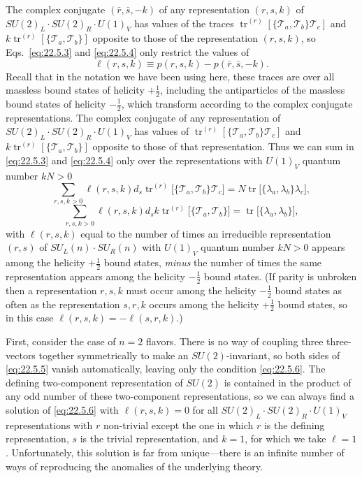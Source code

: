 The complex conjugate $(\bar r,\bar s,-k)$ of any representation $(r,s,k)$
of $SU(2)_L\cdot SU(2)_R\cdot U(1)_V$ has values of the traces
$\operatorname{tr}^{(r)}
[\{\mathcal T_a,\mathcal T_b\}\mathcal T_c]$ and
$k\operatorname{tr}^{(r)}[\{\mathcal T_a,\mathcal T_b\}]$ opposite to
those of the representation $(r,s,k)$, so Eqs.~\eqref{eq:22.5.3} and
\eqref{eq:22.5.4} only restrict the values of
\[
 \ell(r,s,k)\equiv p(r,s,k)-p(\bar r,\bar s,-k).
\]
Recall that in the notation we have been using here, these traces are over
all massless bound states of helicity $+\frac12$, including the
antiparticles of the massless bound states of helicity $-\frac12$, which
transform according to the complex conjugate representations. The complex
conjugate of any representation of
$SU(2)_L\cdot SU(2)_R\cdot U(1)_V$ has values of
$\operatorname{tr}^{(r)}
[\{\mathcal T_a,\mathcal T_b\}\mathcal T_c]$ and
$k\operatorname{tr}^{(r)}[\{\mathcal T_a,\mathcal T_b\}]$ opposite to
those of that representation. Thus we can sum in \eqref{eq:22.5.3} and
\eqref{eq:22.5.4} only over the representations with $U(1)_V$ quantum
number $kN>0$
\begin{equation}
 \sum_{r,s,k>0}\ell(r,s,k)d_s
 \operatorname{tr}^{(r)}
 \bigl[\{\mathcal T_a,\mathcal T_b\}\mathcal T_c\bigr]
 =
 N\operatorname{tr}\bigl[\{\lambda_a,\lambda_b\}\lambda_c\bigr],
 \tag{22.5.5}\label{eq:22.5.5}
\end{equation}
\begin{equation}
 \sum_{r,s,k>0}\ell(r,s,k)d_s k
 \operatorname{tr}^{(r)}
 \bigl[\{\mathcal T_a,\mathcal T_b\}\bigr]
 =
 \operatorname{tr}\bigl[\{\lambda_a,\lambda_b\}\bigr],
 \tag{22.5.6}\label{eq:22.5.6}
\end{equation}
with $\ell(r,s,k)$ equal to the number of times an irreducible
representation $(r,s)$ of $SU_L(n)\cdot SU_R(n)$ with $U(1)_V$ quantum
number $kN>0$ appears among the helicity $+\frac12$ bound states,
\emph{minus} the number of times the same representation appears among the
helicity $-\frac12$ bound states. (If parity is unbroken then a
representation $r,s,k$ must occur among the helicity $-\frac12$ bound
states as often as the representation $s,r,k$ occurs among the helicity
$+\frac12$ bound states, so in this case
$\ell(r,s,k)=-\ell(s,r,k)$.)

First, consider the case of $n=2$ flavors. There is no way of coupling
three three-vectors together symmetrically to make an $SU(2)$-invariant,
so both sides of \eqref{eq:22.5.5} vanish automatically, leaving only the
condition \eqref{eq:22.5.6}. The defining two-component representation of
$SU(2)$ is contained in the product of any odd number of these
two-component representations, so we can always find a solution of
\eqref{eq:22.5.6} with $\ell(r,s,k)=0$ for all
$SU(2)_L\cdot SU(2)_R\cdot U(1)_V$ representations with $r$ non-trivial
except the one in which $r$ is the defining representation, $s$ is the
trivial representation, and $k=1$, for which we take $\ell=1$.
Unfortunately, this solution is far from unique---there is an infinite
number of ways of reproducing the anomalies of the underlying theory.

